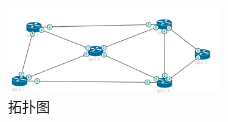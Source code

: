 \begin{figure}[h]
	\centering
	\includegraphics[width=0.5\textwidth]{image/illustration/topo1.png}
	\caption{拓扑图}
 	\label{fig:hole}
\end{figure}
